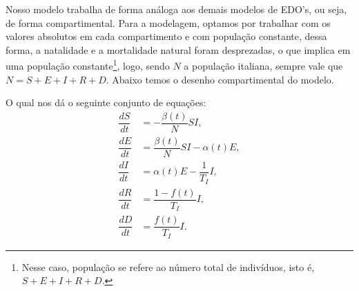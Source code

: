 \documentclass{article}
\begin{document}
% 
Nosso modelo trabalha de forma análoga aos demais modelos de EDO's, ou seja, de forma compartimental. Para a modelagem, optamos por trabalhar com os valores absolutos em cada compartimento e com população constante, dessa forma, a natalidade e a mortalidade natural foram desprezadas, o que implica em uma população constante\footnote{Nesse caso, população se refere ao número total de indivíduos, isto é, $S + E + I + R + D$.}, logo, sendo $N$ a população italiana, sempre vale que $N = S + E + I + R + D$. Abaixo temos o desenho compartimental do modelo.
\begin{center}
\end{center}

O qual nos dá o seguinte conjunto de equações:
\begin{equation}
    \label{fSEIRD}
    \begin{split}
        \dfrac{dS}{dt} & = -\dfrac{\beta(t)}{N}SI, \\
        \dfrac{dE}{dt} & = \dfrac{\beta(t)}{N}SI - \alpha(t) E, \\
        \dfrac{dI}{dt} & = \alpha(t) E - \dfrac{1}{T_I}I, \\
        \dfrac{dR}{dt} & = \dfrac{1 - f(t)}{T_I}I, \\
        \dfrac{dD}{dt} & = \dfrac{f(t)}{T_I}I.
    \end{split}
\end{equation}
\end{document}
